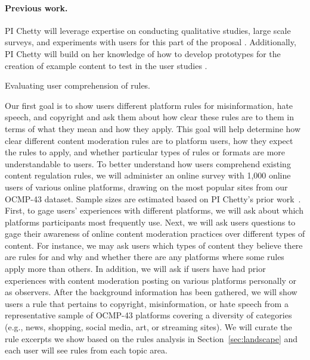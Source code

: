 \paragraph{Previous work.} PI Chetty will leverage expertise on conducting qualitative studies, large scale surveys, and experiments with users for this part of the proposal \cite{wyche2013want, romanosky2018understanding, reichel2020have,chetty2007smart, chetty2008getting, kientz2007grow, poole2008more, poole2009computer, kumar2017notellingpasscodes, mathur_endorsements_2018, swart_is_2020, mathur2015mixed,mathur2016they, mathur2018characterizing, chang2017spiders, mathur2019dark}. Additionally, PI Chetty will build on her knowledge of how to develop prototypes for the creation of example content to test in the user studies \cite{chetty2010s, chetty2011my, chetty2012you, mathur2016they, kumar2018codesign, swart2020ad}.


\begin{task}
Evaluating user comprehension of rules.
\end{task}
Our first goal is to show users different platform rules for
misinformation, hate speech, and copyright and ask them about how clear these rules are to them in terms of what they mean and how they apply. This goal will help determine how clear different content
moderation rules are to platform users, how they expect the rules to apply, and whether particular types of rules or formats are more understandable to users. To better understand how users
comprehend existing content regulation rules, we will administer an online
survey with 1,000 online users of various online platforms, drawing on the most popular sites from our OCMP-43 dataset. Sample sizes are estimated based on PI
Chetty's prior work~\cite{mathur_endorsements_2018}. First, to gage users' experiences with different platforms, we will ask about which platforms participants most frequently use. Next, we will ask users questions to gage their awareness of online content moderation practices over different types of content. For instance, we may ask users which types of content they believe there are rules for and why and whether there are any platforms where some rules apply more than others. In addition, we will ask if users have had prior experiences with content moderation posting on various platforms personally or as observers. After the background information has been gathered, we will show users a rule that pertains to copyright, misinformation, or hate speech from a representative sample of OCMP-43 platforms covering a diversity of categories (e.g., news, shopping, social media, art, or streaming sites). We will curate the rule excerpts we show based on the rules
analysis in Section~\ref{sec:landscape} and each user will see rules from each topic area. 

